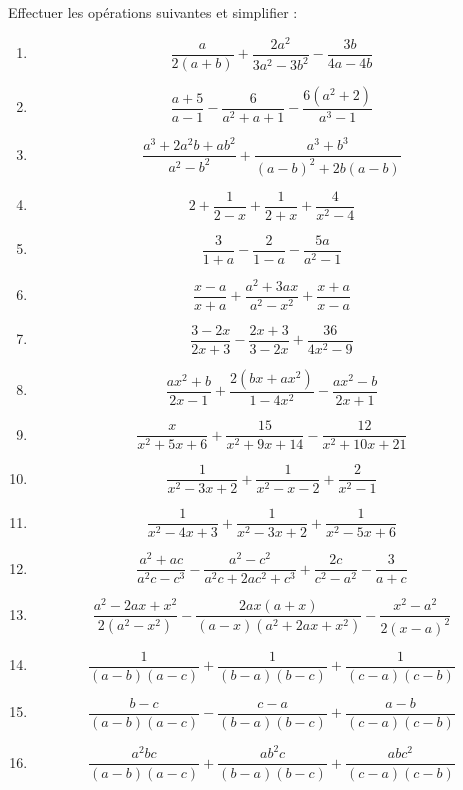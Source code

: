 \begin{exercice}
Effectuer les opérations suivantes et simplifier : 
\begin{multicols}{2}
\begin{enumerate}
\item $$\frac{a}{2(a+b)}+\frac{2{{a}^{2}}}{3{{a}^{2}}-3{{b}^{2}}}-\frac{3b}{4a-4b}$$
\item $$\frac{a+5}{a-1}-\frac{6}{{{a}^{2}}+a+1}-\frac{6({{a}^{2}}+2)}{{{a}^{3}}-1}$$
\item $$\frac{a^3+ 2a^2b+ ab^2}{a^2- b^2} + \frac{a^3+ b^3}{(a-b)^2 + 2b(a-b)}$$
\item $$2+\frac{1}{2-x}+\frac{1}{2+x}+\frac{4}{{{x}^{2}}-4}$$
\item $$\frac{3}{1+a}-\frac{2}{1-a}-\frac{5a}{{{a}^{2}}-1}$$
\item $$\frac{x-a}{x+a}+\frac{{{a}^{2}}+3ax}{{{a}^{2}}-{{x}^{2}}}+\frac{x+a}{x-a}$$
\item $$\frac{3-2x}{2x+3}-\frac{2x+3}{3-2x}+\frac{36}{4{{x}^{2}}-9}$$
\item $$\frac{a{{x}^{2}}+b}{2x-1}+\frac{2(bx+a{{x}^{2}})}{1-4{{x}^{2}}}-\frac{a{{x}^{2}}-b}{2x+1}$$
\item $$\frac{x}{{{x}^{2}}+5x+6}+\frac{15}{{{x}^{2}}+9x+14}-\frac{12}{{{x}^{2}}+10x+21}$$\end{enumerate}
\end{multicols}
\begin{enumerate} \setcounter{enumi}{9}
\item $$\frac{1}{{{x}^{2}}-3x+2}+\frac{1}{{{x}^{2}}-x-2}+\frac{2}{{{x}^{2}}-1}$$
\item $$\frac{1}{{{x}^{2}}-4x+3}+\frac{1}{{{x}^{2}}-3x+2}+\frac{1}{{{x}^{2}}-5x+6}$$
\item $$\frac{{{a}^{2}}+ac}{{{a}^{2}}c-{{c}^{3}}}-\frac{{{a}^{2}}-{{c}^{2}}}{{{a}^{2}}c+2a{{c}^{2}}+{{c}^{3}}}+\frac{2c}{{{c}^{2}}-{{a}^{2}}}-\frac{3}{a+c}$$
\item $$\frac{{{a}^{2}}-2ax+{{x}^{2}}}{2({{a}^{2}}-{{x}^{2}})}-\frac{2ax(a+x)}{(a-x)({{a}^{2}}+2ax+{{x}^{2}})}-\frac{{{x}^{2}}-{{a}^{2}}}{2{{(x-a)}^{2}}}$$
\item $$\frac{1}{(a-b)(a-c)}+\frac{1}{(b-a)(b-c)}+\frac{1}{(c-a)(c-b)}$$
\item $$\frac{b-c}{(a-b)(a-c)}-\frac{c-a}{(b-a)(b-c)}+\frac{a-b}{(c-a)(c-b)}$$
\item $$\frac{{{a}^{2}}bc}{(a-b)(a-c)}+\frac{a{{b}^{2}}c}{(b-a)(b-c)}+\frac{ab{{c}^{2}}}{(c-a)(c-b)}$$ 
\end{enumerate}
\end{exercice}

